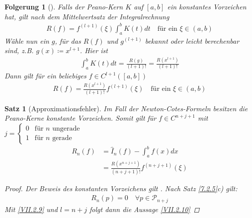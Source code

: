 \documentclass[ngerman,fontsize=11pt, paper=a4, parskip=half, titlepage=true, toc=bib]{scrbook}
\theoremstyle{definition}
\theoremstyle{plain}
\newtheorem{Satz}[Def]{Satz}		%
\newtheorem{Fol}[Def]{Folgerung}
\newenvironment{Satze}[1][]{ %
  \begin{Satz}[#1]  }
  { \end{Satz}
  \addtocounter{subsection}{1}}
\newenvironment{Fole}[1][]{ %
  \begin{Fol}[#1]}
  {\end{Fol}
  \addtocounter{subsection}{1}}
\begin{document}
\begin{Fole}\label{7.2.7}
  Falls der Peano-Kern $K$ auf $[a,b]$ ein konstantes Vorzeichen hat,
  gilt nach dem Mittelwertsatz der Integralrechnung
  \begin{gather}
    R(f) = f^{(l+1)}(\xi) \int_a^b K(t)dt 
    \quad \text{für ein }\xi\in (a,b)
    \label{VII.2.8}
  \end{gather}
  Wähle nun ein $g$, für das $R(f)$ und $g^{(l+1)}$ bekannt oder leicht
  berechenbar sind, z.B.
  $g(x)\coloneqq x^{l+1}$. Hier ist
  \begin{gather*}
    \int_a^bK(t)dt = \frac{R(g)}{(l+1)!} = \frac{R(x^{l+1})}{(l+1)!}
  \end{gather*}
  Dann gilt für ein beliebiges $f\in C^{l+1}([a,b])$
  \begin{gather}
    R(f) = \frac{R(x^{l+1})}{(l+1)!} f^{(l+1)}(\xi)
    \quad \text{für ein }\xi \in (a,b)
    \label{VII.2.9}
  \end{gather}
\end{Fole}

\begin{Satze}[Approximationsfehler]
  Im Fall der Newton-Cotes-Formeln besitzen die Peano-Kerne
  konstante Vorzeichen. Somit gilt für $f\in C^{n+j+1}$ mit 
  $j= \begin{cases}
    0 & \text{für $n$ ungerade}\\
    1 & \text{für $n$ gerade}
  \end{cases}$
  \begin{align}\nonumber
    R_n(f) &= \hat{I}_n (f) - \int_a^b f(x) dx\\
           &= \frac{R(x^{n+j+1})}{(n+j+1)!}f^{(n+j+1)}(\xi)
             \label{VII.2.10}
  \end{align}

  \begin{proof}
    Der Beweis des konstanten Vorzeichens gilt
    \cite[siehe][]{steffensen}.
    Nach Satz \ref{7.2.5}c) gilt:
    \begin{gather*}
      R_n(p) = 0 \quad\forall p\in\mathcal{P}_{n+j}
    \end{gather*}
    Mit \eqref{VII.2.9} und $l=n+j$ folgt dann die Aussage \eqref{VII.2.10}
  \end{proof}
\end{Satze}
\end{document}
